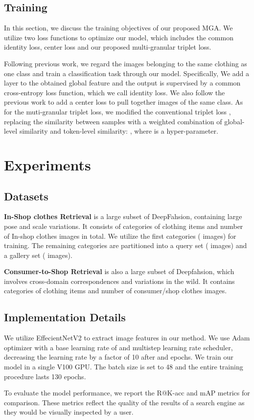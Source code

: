 \documentclass[10pt,twocolumn,letterpaper]{article}
\begin{document}
\subsection{Training}
\label{2.3}
In this section, we discuss the training objectives of our proposed MGA. We utilize two loss functions to optimize our model, which includes the common identity loss, center loss and our proposed multi-granular triplet loss. 
\par Following previous work, we regard the images belonging to the same clothing as one class and train a classification task through our model. Specifically, We add a  layer to the obtained global feature and the output is supervised by a common cross-entropy loss function, which we call identity loss. We also follow the previous work \cite{ctl} to add a center loss to pull together images of the same class.
As for the muti-granular triplet loss, we modified the conventional triplet loss , replacing the similarity between samples with a weighted combination of global-level similarity and token-level similarity: , where  is a hyper-parameter. 

\section{Experiments}
\label{sec:experiments}
\subsection{Datasets}
\textbf{In-Shop clothes Retrieval} \cite{deepfashion} is a large subset of DeepFahsion, containing large pose and scale variations. It consists of  categories of clothing items and  number of In-shop clothes images in total. We utilize the first  categories ( images) for training. The remaining  categories are partitioned into a query set ( images) and a gallery set ( images).  
\par \textbf{Consumer-to-Shop Retrieval} \cite{deepfashion} is also a large subset of Deepfahsion, which involves cross-domain correspondences and variations in the wild. It contains  categories of clothing items and  number of consumer/shop clothes images. 
\subsection{Implementation Details}
We utilize EffecientNetV2 to extract image features in our method. We use Adam optimizer with a base learning rate of  and multistep learning rate scheduler, decreasing the learning rate by a factor of 10 after  and  epochs. We train our model in a single V100 GPU. The batch size is set to 48 and the entire training procedure lasts 130 epochs. 
\par To evaluate the model performance, we report the R@K-acc and mAP metrics for comparison. These metrics reflect the quality of the results of a search engine as they would be visually inspected by a user. 
\end{document}
